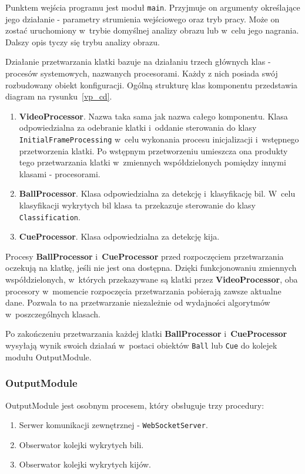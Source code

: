 \documentclass[12pt]{article}
\begin{document}
Punktem wejścia programu jest moduł \lstinline{main}. Przyjmuje on argumenty określające jego działanie - parametry strumienia wejściowego oraz tryb pracy. Może on zostać uruchomiony w~trybie domyślnej analizy obrazu lub w~celu jego nagrania. Dalszy opis tyczy się trybu analizy obrazu.

Działanie przetwarzania klatki bazuje na działaniu trzech głównych klas - procesów systemowych, nazwanych procesorami. Każdy z nich posiada swój rozbudowany obiekt konfiguracji. Ogólną strukturę klas komponentu przedstawia diagram na rysunku~\ref{vp_cd}.

\begin{enumerate}
    \item \textbf{VideoProcessor}. Nazwa taka sama jak nazwa całego komponentu. Klasa odpowiedzialna za odebranie klatki i~oddanie sterowania do klasy \lstinline{InitialFrameProcessing} w~celu wykonania procesu inicjalizacji i~wstępnego przetworzenia klatki. Po wstępnym przetworzeniu umieszcza ona produkty tego przetwarzania klatki w~zmiennych współdzielonych pomiędzy innymi klasami - procesorami.
    \item \textbf{BallProcessor}. Klasa odpowiedzialna za detekcję i~klasyfikację bil. W~celu klasyfikacji wykrytych bil klasa ta przekazuje sterowanie do klasy \lstinline{Classification}.
    \item \textbf{CueProcessor}. Klasa odpowiedzialna za detekcję kija. %
\end{enumerate}

Procesy \textbf{BallProcessor} i~\textbf{CueProcessor} przed rozpoczęciem przetwarzania oczekują na klatkę, jeśli nie jest ona dostępna. Dzięki funkcjonowaniu zmiennych współdzielonych, w~których przekazywane są klatki przez \textbf{VideoProcessor}, oba procesory w~momencie rozpoczęcia przetwarzania pobierają zawsze aktualne dane. Pozwala to na przetwarzanie niezależnie od wydajności algorytmów w~poszczególnych klasach.

Po zakończeniu przetwarzania każdej klatki \textbf{BallProcessor} i~\textbf{CueProcessor} wysyłają wynik swoich działań w~postaci obiektów \lstinline{Ball} lub \lstinline{Cue} do kolejek modułu OutputModule.

\subsubsection{OutputModule}

OutputModule jest osobnym procesem, który obsługuje trzy procedury:
\begin{enumerate} [noitemsep]
    \item Serwer komunikacji zewnętrznej - \lstinline{WebSocketServer}.
    \item Obserwator kolejki wykrytych bili.
    \item Obserwator kolejki wykrytych kijów.
\end{enumerate}
\end{document}

